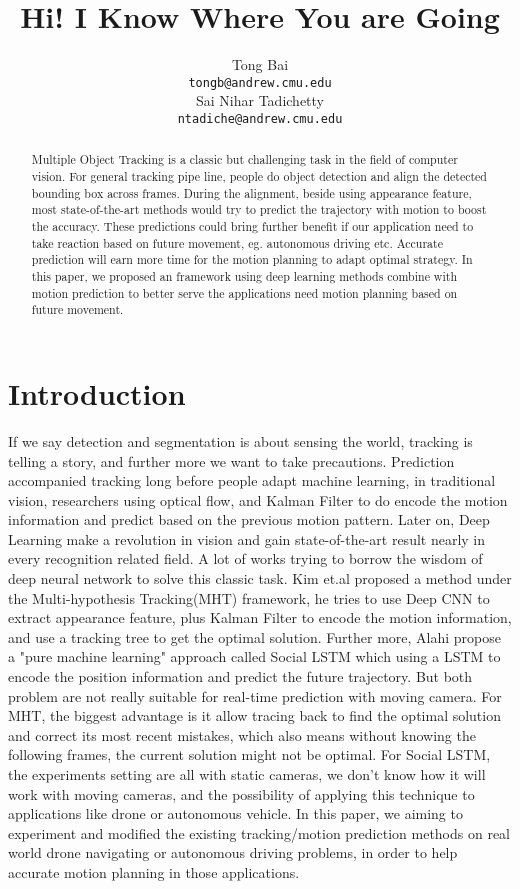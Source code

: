 \documentclass{article}
\title{Hi! I Know Where You are Going}
\author{
  Tong Bai\\
  \texttt{tongb@andrew.cmu.edu} \\
  \And
  Sai Nihar Tadichetty\\
  \texttt{ntadiche@andrew.cmu.edu} \\
}
\begin{document}

\maketitle

\begin{abstract}
  Multiple Object Tracking is a classic but challenging task in the field of computer vision. For general tracking pipe line, people do object detection and align the detected bounding box across frames. During the alignment, beside using appearance feature, most state-of-the-art methods would try to predict the trajectory with motion to boost the accuracy. These predictions could bring further benefit if our application need to take reaction based on future movement, eg. autonomous driving etc. Accurate prediction will earn more time for the motion planning to adapt optimal strategy. In this paper, we proposed an framework using deep learning methods combine with motion prediction to better serve the applications need motion planning based on future movement.
\end{abstract}

\section{Introduction}

If we say detection and segmentation is about sensing the world, tracking is telling a story, and further more we want to take precautions. Prediction accompanied tracking long before people adapt machine learning, in traditional vision, researchers using optical flow, and Kalman Filter to do encode the motion information and predict based on the previous motion pattern. Later on, Deep Learning make a revolution in vision and gain state-of-the-art result nearly in every recognition related field. A lot of works trying to borrow the wisdom of deep neural network to solve this classic task. Kim et.al \cite{kim2015multiple} proposed a method under the Multi-hypothesis Tracking(MHT) framework, he tries to use Deep CNN to extract appearance feature, plus Kalman Filter to encode the motion information, and use a tracking tree to get the optimal solution. Further more, Alahi propose a "pure machine learning" approach called Social LSTM \cite{Alahi_2016_CVPR} which using a LSTM to encode the position information and predict the future trajectory. But both problem are not really suitable for real-time prediction with moving camera. For MHT, the biggest advantage is it allow tracing back to find the optimal solution and correct its most recent mistakes, which also means without knowing the following frames, the current solution might not be optimal. For Social LSTM, the experiments setting are all with static cameras, we don't know how it will work with moving cameras, and the possibility of applying this technique to applications like drone or autonomous vehicle.  In this paper, we aiming to experiment and modified the existing tracking/motion prediction methods on real world drone navigating or autonomous driving problems, in order to help accurate motion planning in those applications.



\end{document}
